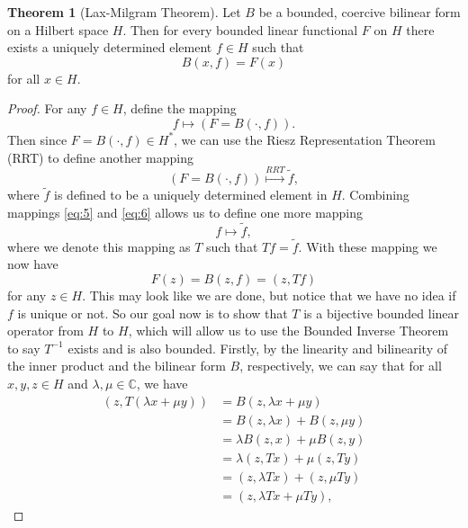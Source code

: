 \documentclass[11pt]{article}
\theoremstyle{definition}
\newtheorem*{theorem}{Theorem}
\begin{document}
\begin{theorem}[Lax-Milgram Theorem]
	Let $B$ be a bounded, coercive bilinear form on a Hilbert space $H$. Then for every bounded linear functional $F$ on $H$
	there exists a uniquely determined element $f\in H$ such that
	\begin{equation*}
		B(x,f) = F(x)
	\end{equation*}
	for all $x \in H$.
\end{theorem}
\begin{proof}
	For any $f \in H$, define the mapping 
	\begin{equation}
		\label{eq:5}
		f \mapsto (F = B(\cdot, f)).
	\end{equation}
	Then since $F = B(\cdot, f) \in H^*$, we can use the Riesz Representation Theorem (RRT) to  define another mapping
	\begin{equation}
		\label{eq:6}
		(F = B(\cdot,f)) \stackrel{RRT}{\mapsto} \tilde{f},
	\end{equation}
	where $\tilde{f}$ is defined to be a uniquely determined element in $H$.
	Combining mappings \ref{eq:5} and \ref{eq:6} allows us to define one more mapping
	\begin{equation}
		\label{eq:7}
		f \mapsto \tilde{f},
	\end{equation}
	where we denote this mapping as $T$ such that $Tf = \tilde{f}$.
	With these mapping we now have
	\begin{equation*}
		F(z) = B(z,f) = (z,Tf)
	\end{equation*}
	for any $z \in H$.
	This may look like we are done, but notice that we have no idea if $f$ is unique or not.
	So our goal now is to show that $T$ is a bijective bounded linear operator from $H$ to $H$,
	which will allow us to use the Bounded Inverse Theorem to say $T^{-1}$ exists and is also bounded.
	Firstly, by the linearity and bilinearity of the inner product and the bilinear form $B$, respectively,
	we can say that for all $x,y,z \in H$ and $\lambda, \mu \in \mathbb{C}$, we have
	\begin{equation*}
		\begin{aligned}
			(z,T(\lambda x + \mu y)) &= B(z, \lambda x + \mu y) \\
						 &= B(z,\lambda x) + B(z, \mu y) \\
						 &= \lambda B(z,x) + \mu B(z,y) \\
						 &= \lambda (z,Tx) + \mu (z,Ty) \\
						 &= (z,\lambda Tx) + (z, \mu Ty) \\
						 &= (z, \lambda Tx + \mu Ty),

\end{aligned}
\end{equation*}
\end{proof}
\end{document}
